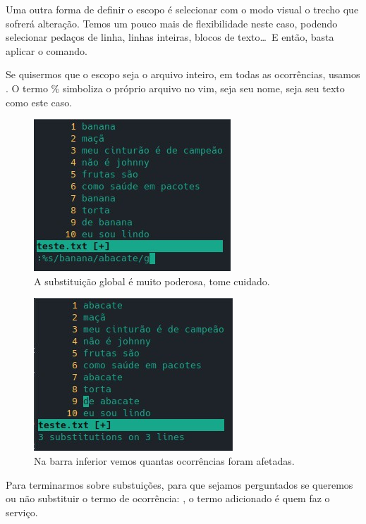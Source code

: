 Uma outra forma de definir o escopo é selecionar com o modo visual o trecho
que sofrerá alteração.
Temos um pouco mais de flexibilidade neste caso, podendo selecionar pedaços de linha,
linhas inteiras,
blocos de texto\ldots\
E então, basta aplicar o comando.

Se quisermos que o escopo seja o arquivo inteiro, em todas as ocorrências, usamos .
O termo \% simboliza o próprio arquivo no vim, seja seu nome, seja seu texto como este caso.

\begin{figure}[!htb]
\centering
\includegraphics[scale=1.20]{recursos_avancados/Substituicao_global.jpg}
\caption{A substituição global é muito poderosa, tome cuidado.}
\end{figure}

\begin{figure}[!htb]
\centering
\includegraphics[scale=1.20]{recursos_avancados/Substituicao_global_realizada.jpg}
\caption{Na barra inferior vemos quantas ocorrências foram afetadas.}
\end{figure}

Para terminarmos sobre substuições, para que sejamos perguntados se queremos ou não substituir o termo de ocorrência:
\vimcommand{:\%s/ocorr/subst/gc}, o termo \vimcommand{c} adicionado é quem faz o serviço.

